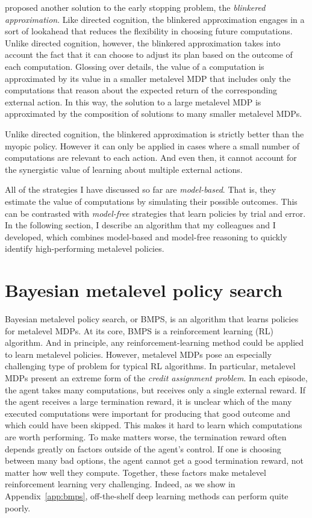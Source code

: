 \citet{hay2012selecting} proposed another solution to the early stopping problem, the \emph{blinkered approximation}. Like directed cognition, the blinkered approximation engages in a sort of lookahead that reduces the flexibility in choosing future computations. Unlike directed cognition, however, the blinkered approximation takes into account the fact that it can choose to adjust its plan based on the outcome of each computation. Glossing over details, the value of a computation is approximated by its value in a smaller metalevel MDP that includes only the computations that reason about the expected return of the corresponding external action. In this way, the solution to a large metalevel MDP is approximated by the composition of solutions to many smaller metalevel MDPs. 

Unlike directed cognition, the blinkered approximation is strictly better than the myopic policy. However it can only be applied in cases where a small number of computations are relevant to each action. And even then, it cannot account for the synergistic value of learning about multiple external actions. 

\separator

All of the strategies I have discussed so far are \emph{model-based}. That is, they estimate the value of computations by simulating their possible outcomes. This can be contrasted with \emph{model-free} strategies that learn policies by trial and error. In the following section, I describe an algorithm that my colleagues and I developed, which combines model-based and model-free reasoning to quickly identify high-performing metalevel policies.


\section{Bayesian metalevel policy search}\label{sec:bmps}

Bayesian metalevel policy search, or BMPS, is an algorithm that learns policies for metalevel MDPs. At its core, BMPS is a reinforcement learning (RL) algorithm. And in principle, any reinforcement-learning method could be applied to learn metalevel policies. However, metalevel MDPs pose an especially challenging type of problem for typical RL algorithms. In particular, metalevel MDPs present an extreme form of the \emph{credit assignment problem}. In each episode, the agent takes many computations, but receives only a single external reward. If the agent receives a large termination reward, it is unclear which of the many executed computations were important for producing that good outcome and which could have been skipped. This makes it hard to learn which computations are worth performing. To make matters worse, the termination reward often depends greatly on factors outside of the agent's control. If one is choosing between many bad options, the agent cannot get a good termination reward, not matter how well they compute. Together, these factors make metalevel reinforcement learning very challenging. Indeed, as we show in Appendix~\ref{app:bmps}, off-the-shelf deep learning methods can perform quite poorly.

